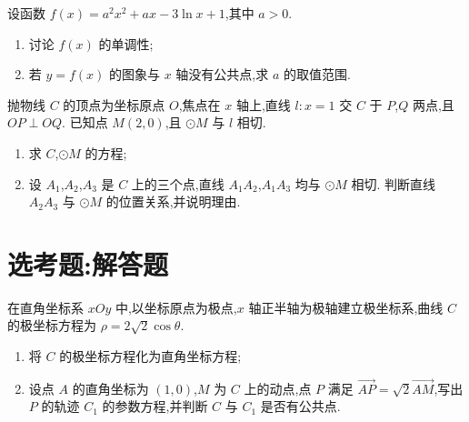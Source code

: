 
\begin{problem}
设函数 \(f(x)=a^2x^2+ax-3\ln x+1\),其中 \(a>0\).

\begin{enumerate}
\item 讨论 \(f(x)\) 的单调性;
\item 若 \(y=f(x)\) 的图象与 \(x\) 轴没有公共点,求 \(a\) 的取值范围.
\end{enumerate}
\end{problem}


\begin{problem}
抛物线 \(C\) 的顶点为坐标原点 \(O\),焦点在 \(x\) 轴上,直线 \(l:x=1\) 交 \(C\) 于 \(P\),\(Q\) 两点,且 \(OP\perp OQ\). 已知点 \(M(2,0)\),且 \(\odot M\) 与 \(l\) 相切.

\begin{enumerate}
\item 求 \(C\),\(\odot M\) 的方程;
\item 设 \(A_1\),\(A_2\),\(A_3\) 是 \(C\) 上的三个点,直线 \(A_1A_2\),\(A_1A_3\) 均与 \(\odot M\) 相切. 判断直线 \(A_2A_3\) 与 \(\odot M\) 的位置关系,并说明理由.
\end{enumerate}
\end{problem}


\section{选考题:解答题}

\begin{problem}
在直角坐标系 \(xOy\) 中,以坐标原点为极点,\(x\) 轴正半轴为极轴建立极坐标系,曲线 \(C\) 的极坐标方程为 \(\rho=2\sqrt{2}\cos\theta\).

\begin{enumerate}
\item 将 \(C\) 的极坐标方程化为直角坐标方程;
\item 设点 \(A\) 的直角坐标为 \((1,0)\),\(M\) 为 \(C\) 上的动点,点 \(P\) 满足 \(\overrightarrow{AP}=\sqrt{2}\overrightarrow{AM}\),写出 \(P\) 的轨迹 \(C_1\) 的参数方程,并判断 \(C\) 与 \(C_1\) 是否有公共点.
\end{enumerate}
\end{problem}

